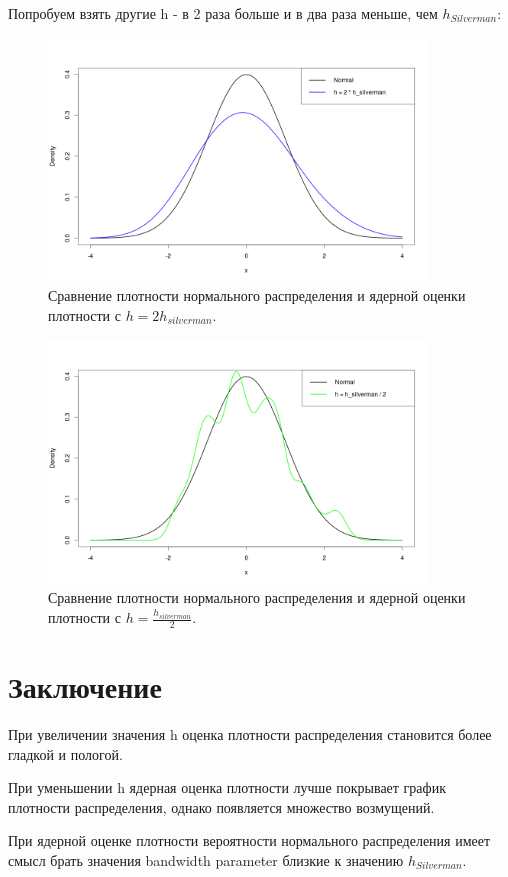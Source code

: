 \documentclass{article} %
\begin{document}
\newpage
Попробуем взять другие h - в 2 раза больше и в два раза меньше, чем $h_{Silverman}$:

\begin{figure}[H]
    \captionsetup{justification=centering}
    \includegraphics[width=0.9\textwidth]{plot2}
    \caption{Сравнение плотности нормального распределения и ядерной оценки плотности с $h = 2 h_{silverman}$.}
\end{figure}

\begin{figure}[H]
    \captionsetup{justification=centering}
    \includegraphics[width=0.9\textwidth]{plot3}
    \caption{Сравнение плотности нормального распределения и ядерной оценки плотности с $h = \frac{h_{silverman}}{2}$.}
\end{figure}

\section{Заключение}
При увеличении значения h оценка плотности распределения становится более гладкой и пологой.

При уменьшении h ядерная оценка плотности лучше покрывает график плотности распределения, однако появляется множество возмущений.

При ядерной оценке плотности вероятности нормального распределения имеет смысл брать значения bandwidth parameter близкие к значению $h_{Silverman}$.
\end{document}
